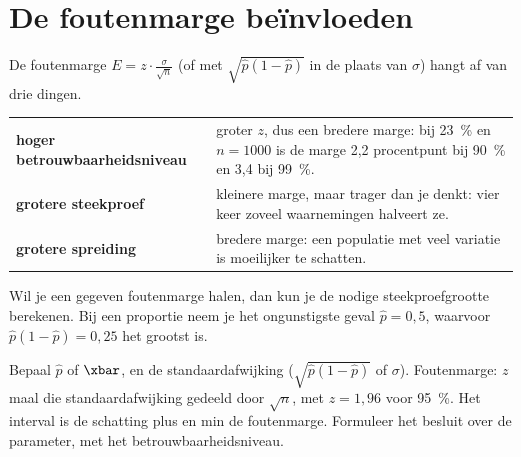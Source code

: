\section{De foutenmarge beïnvloeden}

De foutenmarge $E = z \cdot \frac{\sigma}{\sqrt n}$ (of met $\sqrt{\hat{p}(1 - \hat{p})}$ in de plaats van $\sigma$) hangt af van drie dingen.

{\renewcommand{\arraystretch}{1.4}%
\begin{tabular}{@{}>{\RaggedRight\arraybackslash\bfseries}p{4.2cm}>{\RaggedRight\arraybackslash}p{11.4cm}@{}}
hoger betrouwbaarheidsniveau & groter $z$, dus een bredere marge: bij 23~\% en $n = 1000$ is de marge 2,2 procentpunt bij 90~\% en 3,4 bij 99~\%. \\
grotere steekproef & kleinere marge, maar trager dan je denkt: vier keer zoveel waarnemingen halveert ze. \\
grotere spreiding & bredere marge: een populatie met veel variatie is moeilijker te schatten.
\end{tabular}\par}

Wil je een gegeven foutenmarge halen, dan kun je de nodige steekproefgrootte berekenen. Bij een proportie neem je het ongunstigste geval $\hat{p} = 0{,}5$, waarvoor $\hat{p}(1 - \hat{p}) = 0{,}25$ het grootst is.


\begin{werkwijze}
Bepaal $\hat{p}$ of $\xbar$, en de standaardafwijking ($\sqrt{\hat{p}(1 - \hat{p})}$ of $\sigma$). Foutenmarge: $z$ maal die standaardafwijking gedeeld door $\sqrt n$, met $z = 1{,}96$ voor 95~\%. Het interval is de schatting plus en min de foutenmarge. Formuleer het besluit over de parameter, met het betrouwbaarheidsniveau.
\end{werkwijze}

